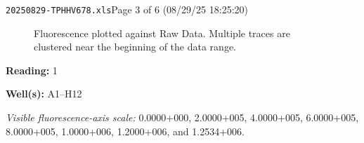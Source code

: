 \documentclass[UTF8,10pt,a4paper,fontset=fandol]{ctexart}
\begin{document}
\noindent\texttt{20250829-TPHHV678.xls}\hfill Page 3 of 6 (08/29/25 18:25:20)

\newpage

\begin{figure}[ht]
\centering
\caption{Fluorescence plotted against Raw Data. Multiple traces are clustered near the beginning of the data range.}
\end{figure}

\noindent
\textbf{Reading:} 1

\noindent
\textbf{Well(s):} A1--H12

\noindent
\textit{Visible fluorescence-axis scale:} 0.0000+000, 2.0000+005, 4.0000+005, 6.0000+005, 8.0000+005, 1.0000+006, 1.2000+006, and 1.2534+006.

\newpage
\end{document}
